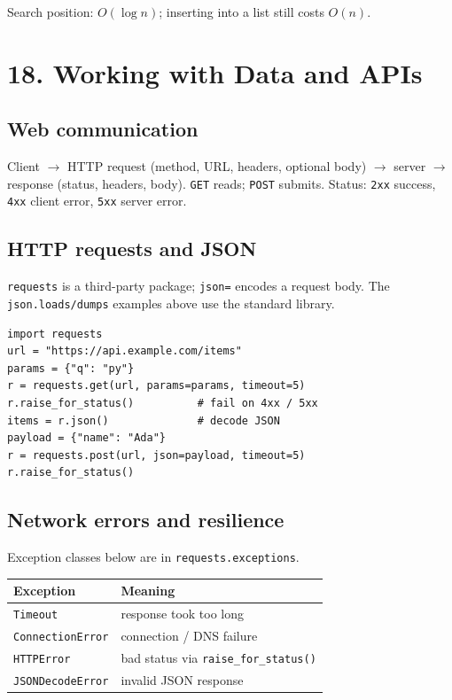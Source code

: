 \documentclass[10pt,a4paper]{article}
\newcommand{\py}[1]{\texttt{#1}}
\newenvironment{tbl}{\par\begin{lrbox}{\tblbox}\begin{minipage}{\linewidth}\compacttable}%
  {\end{minipage}\end{lrbox}\noindent\raisebox{\dp\tblbox}{\usebox{\tblbox}}\par}
\newcommand{\compacttable}{\fontsize{10}{11.2}\selectfont\setlength{\tabcolsep}{2.5pt}\renewcommand{\arraystretch}{1.08}}
\begin{document}
\begin{multicols}{2}
Search position: $O(\log n)$; inserting into a list still costs $O(n)$.

\section{18. Working with Data and APIs}

\subsection{Web communication}

Client $\rightarrow$ HTTP request (method, URL, headers, optional body) $\rightarrow$ server $\rightarrow$ response (status, headers, body). \py{GET} reads; \py{POST} submits. Status: \py{2xx} success, \py{4xx} client error, \py{5xx} server error.

\subsection{HTTP requests and JSON}

\py{requests} is a third-party package; \py{json=} encodes a request body. The \py{json.loads/dumps} examples above use the standard library.

\begin{lstlisting}
import requests
url = "https://api.example.com/items"
params = {"q": "py"}
r = requests.get(url, params=params, timeout=5)
r.raise_for_status()          # fail on 4xx / 5xx
items = r.json()              # decode JSON
payload = {"name": "Ada"}
r = requests.post(url, json=payload, timeout=5)
r.raise_for_status()
\end{lstlisting}

\subsection{Network errors and resilience}

Exception classes below are in \py{requests.exceptions}.

\begin{tbl}
\begin{tabularx}{\linewidth}{@{}R{.44\linewidth}L@{}}
\toprule
\textbf{Exception} & \textbf{Meaning} \\
\midrule
\py{Timeout} & response took too long \\
\py{ConnectionError} & connection / DNS failure \\
\py{HTTPError} & bad status via \py{raise\_for\_status()} \\
\py{JSONDecodeError} & invalid JSON response \\
\bottomrule
\end{tabularx}
\end{tbl}


\end{multicols}
\end{document}
